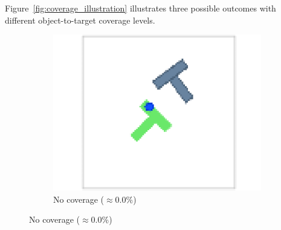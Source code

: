 Figure~\ref{fig:coverage_illustration} illustrates three possible outcomes with different object-to-target
coverage levels.
\begin{figure}[!htb]
    \centering
    \begin{subfigure}[b]{0.4\linewidth}
        \centering
        \includegraphics[width=\linewidth]{figures/illustration_0.pdf}
        \caption{No coverage ($\approx 0.0\%$)}
    \end{subfigure}


\end{figure}
